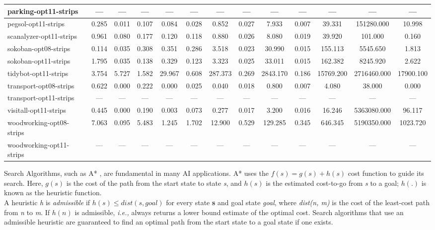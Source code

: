 \documentclass[a4paper,12pt]{article}
\begin{document}
\begin{table}[]
\begin{tabular}{l@{\hspace{6pt}} *{12}{c}}
parking-opt11-strips    & --- & --- & --- & --- & --- & --- & --- & --- & --- & --- & --- & --- \\ \hline
pegsol-opt11-strips     & 0.285 & 0.011 & 0.107 & 0.084 & 0.028 & 0.852 & 0.027 & 7.933 & 0.007 & 39.331 & 151280.000 & 10.998 \\ \hline
scanalyzer-opt11-strips & 0.961 & 0.080 & 0.177 & 0.120 & 0.118 & 0.880 & 0.026 & 8.080 & 0.019 & 39.920 & 101.000 & 0.160 \\ \hline
sokoban-opt08-strips    & 0.114 & 0.035 & 0.308 & 0.351 & 0.286 & 3.518 & 0.023 & 30.990 & 0.015 & 155.113 & 5545.650 & 1.813 \\ \hline
sokoban-opt11-strips    & 1.795 & 0.035 & 0.138 & 0.329 & 0.123 & 3.323 & 0.025 & 33.011 & 0.015 & 162.382 & 8245.920 & 2.622 \\ \hline
tidybot-opt11-strips    & 3.754 & 5.727 & 1.582 & 29.967 & 0.608 & 287.373 & 0.269 & 2843.170 & 0.186 & 15769.200 & 2716460.000 & 17900.100 \\ \hline
transport-opt08-strips  & 0.622 & 0.000 & 0.222 & 0.000 & 0.025 & 0.040 & 0.018 & 0.800 & 0.007 & 4.080 & 38.000 & 0.000 \\ \hline
transport-opt11-strips  & --- & --- & --- & --- & --- & --- & --- & --- & --- & --- & --- & --- \\ \hline
visitall-opt11-strips   & 0.445 & 0.000 & 0.190 & 0.003 & 0.073 & 0.277 & 0.017 & 3.200 & 0.016 & 16.246 & 5363080.000 & 96.117 \\ \hline
woodworking-opt08-strips& 7.063 & 0.095 & 5.483 & 1.245 & 1.702 & 12.900 & 0.529 & 129.285 & 0.345 & 646.345 & 5190350.000 & 1023.720 \\ \hline
woodworking-opt11-strips& --- & --- & --- & --- & --- & --- & --- & --- & --- & --- & --- & --- \\ \hline
\end{tabular}
\end{table}



Search Algorithms, such as A* \citep{hart1968formal}, are fundamental in many AI applications. A* uses the $f(s) = g(s) + h(s)$ cost function to guide its search. Here, $g(s)$ is the cost of the path from the start state to state \textit{s}, and $h(s)$ is the estimated cost-to-go from \textit{s} to a goal; $h(.)$ is known as the heuristic function.\\

 A heuristic \textit{h} is \textit{admissible} if $h(s) \leq dist(s, goal)$ for every state \textbf{s} and goal state \textit{goal}, where \textit{dist(n, m)} is the cost of the least-cost path from \textit{n} to \textit{m}. If $h(n)$ is admissible, \textit{i.e.,} always returns a lower bound estimate of the optimal cost. Search algorithms that use an admissible heuristic are guaranteed to find an optimal path from the start state to a goal state if one exists.\\
\end{document}
